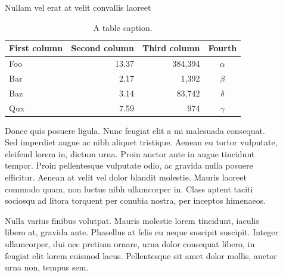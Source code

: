 \documentclass[final]{beamer}
\newlength{\sepwidth}
\newlength{\colwidth}
\newcommand{\separatorcolumn}{\begin{column}{\sepwidth}\end{column}}
\begin{document}
\begin{frame}[t]
\begin{columns}[t]
\begin{column}{\colwidth}
\begin{block}{Nullam vel erat at velit convallis laoreet}
                    \begin{table}
                        \centering
                        \begin{tabular}{l r r c}
                            \toprule
                            \textbf{First column} & \textbf{Second column} & \textbf{Third column} & \textbf{Fourth} \\
                            \midrule
                            Foo & 13.37 & 384,394 & $\alpha$ \\
                            Bar & 2.17 & 1,392 & $\beta$ \\
                            Baz & 3.14 & 83,742 & $\delta$ \\
                            Qux & 7.59 & 974 & $\gamma$ \\
                            \bottomrule
                        \end{tabular}
                        \caption{A table caption.}
                    \end{table}

                    Donec quis posuere ligula. Nunc feugiat elit a mi malesuada consequat. Sed
                    imperdiet augue ac nibh aliquet tristique. Aenean eu tortor vulputate,
                    eleifend lorem in, dictum urna. Proin auctor ante in augue tincidunt
                    tempor. Proin pellentesque vulputate odio, ac gravida nulla posuere
                    efficitur. Aenean at velit vel dolor blandit molestie. Mauris laoreet
                    commodo quam, non luctus nibh ullamcorper in. Class aptent taciti sociosqu
                    ad litora torquent per conubia nostra, per inceptos himenaeos.

                    Nulla varius finibus volutpat. Mauris molestie lorem tincidunt, iaculis
                    libero at, gravida ante. Phasellus at felis eu neque suscipit suscipit.
                    Integer ullamcorper, dui nec pretium ornare, urna dolor consequat libero,
                    in feugiat elit lorem euismod lacus. Pellentesque sit amet dolor mollis,
                    auctor urna non, tempus sem.

                \end{block}

            \end{column}

            \separatorcolumn

            \begin{column}{\colwidth}


\end{column}
\end{columns}
\end{frame}
\end{document}

